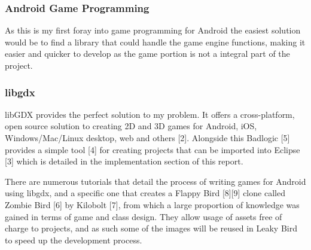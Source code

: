 \subsubsection{Android Game Programming}
As this is my first foray into game programming for Android the easiest solution would be to find a library that could handle the game engine functions, making it easier and quicker to develop as the game portion is not a integral part of the project.

\subsubsection*{libgdx}
libGDX provides the perfect solution to my problem. It offers a cross-platform, open source solution to creating 2D and 3D games for Android, iOS, Windows/Mac/Linux desktop, web and others [2]. Alongside this Badlogic [5] provides a simple tool [4] for creating projects that can be imported into Eclipse [3] which is detailed in the implementation section of this report.

There are numerous tutorials that detail the process of writing games for Android using libgdx, and a specific one that creates a Flappy Bird [8][9] clone called Zombie Bird [6] by Kilobolt [7], from which a large proportion of knowledge was gained in terms of game and class design. They allow usage of assets free of charge to projects, and as such some of the images will be reused in Leaky Bird to speed up the development process.
